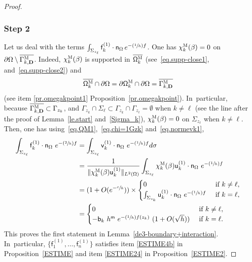 \documentclass[10pt]{amsart}
\newcommand{\Psfrac}[2]{(\sfrac{#1}{#2})}
\newcommand{\mbf}[1]{\mathbf{#1}}
\let\pa\partial
\theoremstyle{plain}
\theoremstyle{definition}
\begin{document}
\begin{proof}
\subsubsection*{Step 2} Let us deal with the terms $ \int_{\Sigma_{z_\ell}} \mathsf f_k^{(1)} \cdot \mathsf n_\Omega \, e^{- \Psfrac{1}{h} f} $.
One has
$\chi_k^{\textsc{M}} (\beta)=0$ on $\partial \Omega\setminus \overline{\Gamma_{k,\mbf D}^{ \textsc{M} }}$.
Indeed, $\chi_k^{\textsc{M}} (\beta)$ is supported in $\overline{\mathsf \Omega_k^{\textsc{M}}}$ (see~\eqref{eq.supp-close1}, and~\eqref{eq.supp-close2}) and
\[
\overline{ \mathsf \Omega_k^{\textsc{M}}}\cap \partial \Omega = \pa \mathsf \Omega_k^{\textsc{M}}\cap \partial \Omega= \overline{\Gamma_{k,\mbf D}^{\textsc{M}}}
\]
(see item \eqref{pr.omegakpoint1} Proposition~\ref{pr.omegakpoint}). In~particular, because $\overline{\Gamma_{k,\mbf D}^{\textsc{M}} }\subset \Gamma_{z_k}$, and $\Gamma_{z_k}\cap \Sigma_\ell \subset \Gamma_{z_k}\cap \Gamma_{z_\ell}=\emptyset$ when $k\neq \ell$ (see the line after the proof of Lemma~\ref{le.start} and~\eqref{Sigma_k}), $\chi_k^{\textsc{M}} (\beta)=0$ on $\Sigma_{z_\ell}$ when $k\neq \ell$.
Then, one has using~\eqref{eq.QM1},~\eqref{eq.chi=1Gzk} and~\eqref{eq.normevk1},
\begin{align*}
\int_{\Sigma_{z_\ell}} \mathsf f_k^{(1)} \cdot \mathsf n_\Omega \ e^{-\Psfrac{2}{h} f} &= \int_{\Sigma_{z_\ell}} \mathsf v_k^{(1)} \cdot \mathsf n_\Omega \ e^{- \Psfrac{1}{h} f} d\sigma\\
&= \frac{ 1}{\Vert \chi_k^{\textsc{M}} (\beta)\mathsf u_k^{(1)}\Vert _{ L^2 (\Omega) }} \int_{\Sigma_{z_\ell}} \chi_k^{\textsc{M}} (\beta) \mathsf u_k^{(1)} \cdot \mathsf n_\Omega \ e^{- \Psfrac{1}{h} f} \\
&=(1+O(e^{-\sfrac ch}))\times
\begin{cases} 0 & \text{ if } k\neq \ell,\\
\int_{\Sigma_{z_k}} \mathsf u_k^{(1)} \cdot \mathsf n_\Omega \ e^{- \Psfrac{1}{h} f} & \text{ if } k=\ell,
\end{cases} \\
&= \begin{cases} 0 & \text{ if } k\neq \ell,\\
-\mathsf b_k \ h^{\mathsf m } \ e^{-\Psfrac{1}{h} f(z_k)} \ (1 + O(\sqrt h)) & \text{ if } k=\ell.
\end{cases}
\end{align*}
This proves the first statement in Lemma~\ref{de3-boundary+interaction}. In~particular, $\{\mathsf f_1^{(1)}, \ldots, \mathsf f_n^{(1)}\} $ satisfies item \eqref{ESTIME4b} in Proposition~\ref{ESTIME} and item \eqref{ESTIME24} in Proposition~\ref{ESTIME2}.


\end{proof}
\end{document}
